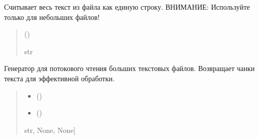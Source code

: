 \documentclass[a4paper,11pt,russian,openany,oneside]{sphinxmanual}
\begin{document}
\begin{savenotes}\begin{fulllineitems}
\label{\detokenize{scan_module:id5}}
\pysigstartsignatures
\pysiglinewithargsret
{}
{}
{}
\pysigstopsignatures
\sphinxAtStartPar
Считывает весь текст из файла как единую строку.
ВНИМАНИЕ: Используйте только для небольших файлов!
\begin{quote}\begin{description}
\sphinxAtStartPar
{} ()

\sphinxAtStartPar
str

\end{description}\end{quote}

\end{fulllineitems}\end{savenotes}


\begin{savenotes}\begin{fulllineitems}
\label{\detokenize{scan_module:id6}}
\pysigstartsignatures
\pysiglinewithargsret
{}
{\sphinxparamcomma {}}
{}
\pysigstopsignatures
\sphinxAtStartPar
Генератор для потокового чтения больших текстовых файлов.
Возвращает чанки текста для эффективной обработки.
\begin{quote}\begin{description}
\begin{itemize}
\item {} 
\sphinxAtStartPar
{} ()

\item {} 
\sphinxAtStartPar
{} ()

\end{itemize}

\sphinxAtStartPar
\sphinxstyleemphasis{Generator}{[}str, None, None{]}

\end{description}\end{quote}

\end{fulllineitems}\end{savenotes}
\end{document}

